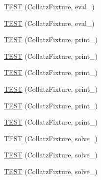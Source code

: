 \begin{DoxyCompactItemize}
\item 
\hyperlink{TestCollatz_8c_09_09_ab529bbfe532bd0b6fbc11c51fe0af7e5}{\-T\-E\-S\-T} (\-Collatz\-Fixture, eval\-\_)
\item 
\hyperlink{TestCollatz_8c_09_09_adebb7237f2a00c256cd0c733885ccd58}{\-T\-E\-S\-T} (\-Collatz\-Fixture, eval\-\_)
\item 
\hyperlink{TestCollatz_8c_09_09_a4bb3bce9465d20c35ec420e187f958c8}{\-T\-E\-S\-T} (\-Collatz\-Fixture, print\-\_)
\item 
\hyperlink{TestCollatz_8c_09_09_a710b14401102f6b4647268dd499a6c63}{\-T\-E\-S\-T} (\-Collatz\-Fixture, print\-\_)
\item 
\hyperlink{TestCollatz_8c_09_09_a3395d41febaedb3e4da972563e0cd383}{\-T\-E\-S\-T} (\-Collatz\-Fixture, print\-\_)
\item 
\hyperlink{TestCollatz_8c_09_09_ab955fb99f29049a09141ef516e672f4f}{\-T\-E\-S\-T} (\-Collatz\-Fixture, print\-\_)
\item 
\hyperlink{TestCollatz_8c_09_09_adc7e320a34f5061bd7a8011e47dc0f7b}{\-T\-E\-S\-T} (\-Collatz\-Fixture, print\-\_)
\item 
\hyperlink{TestCollatz_8c_09_09_a16aff1698853f8f5f5fe0a170dcd5ba5}{\-T\-E\-S\-T} (\-Collatz\-Fixture, print\-\_)
\item 
\hyperlink{TestCollatz_8c_09_09_a3a16aafdd5586fe2f7442e7530e2ab6f}{\-T\-E\-S\-T} (\-Collatz\-Fixture, solve\-\_)
\item 
\hyperlink{TestCollatz_8c_09_09_a231d54f2c8c30622abc04e3e0fddb29f}{\-T\-E\-S\-T} (\-Collatz\-Fixture, solve\-\_)
\item 
\hyperlink{TestCollatz_8c_09_09_a5a6c3fb3d6ec07ebde790a169240adbe}{\-T\-E\-S\-T} (\-Collatz\-Fixture, solve\-\_)
\end{DoxyCompactItemize}


